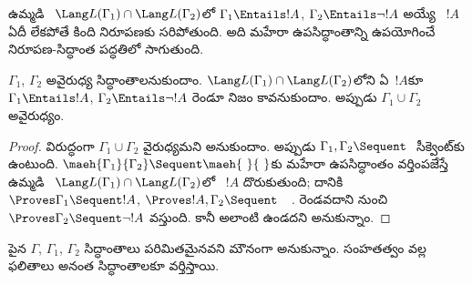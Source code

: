 \documentclass[../../../include/open-logic-section]{subfiles}
\begin{document}
ఉమ్మడి ~$\Lang L(\Gamma_1) \cap \Lang L(\Gamma_2)$లో $\Gamma_1
\Entails !A$, $\Gamma_2 \Entails \lnot !A$ అయ్యే ~$!A$ ఏదీ లేకపోతే కింది నిరూపణకు సరిపోతుంది. అది మహేరా ఉపసిద్ధాంతాన్ని ఉపయోగించే నిరూపణ-సిద్ధాంత పద్ధతిలో సాగుతుంది.

\begin{thm}[రాబిన్సన్ సంయుక్త అవైరుధ్య ప్రమేయం]
$\Gamma_1$, $\Gamma_2$ అవైరుధ్య సిద్ధాంతాలనుకుందాం.  $\Lang L(\Gamma_1) \cap \Lang L(\Gamma_2)$లోని ఏ~$!A$కూ $\Gamma_1 \Entails !A$, $\Gamma_2 \Entails \lnot !A$ రెండూ నిజం కావనుకుందాం. అప్పుడు $\Gamma_1 \cup \Gamma_2$ అవైరుధ్యం.
\end{thm}

\begin{proof}
  విరుద్ధంగా $\Gamma_1 \cup \Gamma_2$ వైరుధ్యమని అనుకుందాం. అప్పుడు $\Gamma_1, \Gamma_2 \Sequent \ $ సీక్వెంట్‌కు  ఉంటుంది. $\maeh{\Gamma_1}{\Gamma_2}
  \Sequent \maeh{\ }{\ }$కు మహేరా ఉపసిద్ధాంతం వర్తింపజేస్తే ఉమ్మడి ~$\Lang L(\Gamma_1) \cap \Lang L(\Gamma_2)$లో ~$!A$ దొరుకుతుంది; దానికి $\Proves \Gamma_1 \Sequent !A$, $\Proves !A, \Gamma_2 \Sequent
  \quad$. రెండవదాని నుంచి $\Proves \Gamma_2 \Sequent \lnot !A$ వస్తుంది. కానీ అలాంటి  ఉండదని అనుకున్నాం.
\end{proof}

పైన $\Gamma$, $\Gamma_1$, $\Gamma_2$ సిద్ధాంతాలు పరిమితమైనవని మౌనంగా అనుకున్నాం. సంహతత్వం వల్ల ఫలితాలు అనంత సిద్ధాంతాలకూ వర్తిస్తాయి.
\end{document}
